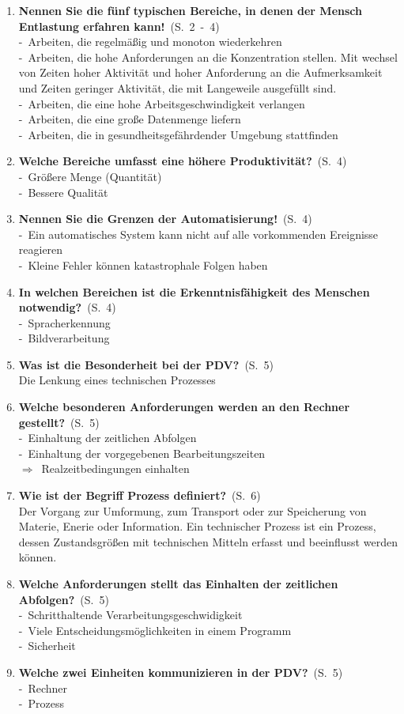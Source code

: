 \documentclass[a4paper,12pt]{article}
\newcommand{\question}[3]{\pagebreak[3]\item {\textbf{#1?}}\ (S.\ #2)#3}
\newcommand{\statement}[3]{\pagebreak[3]\item {\textbf{#1!}}\ (S.\ #2)#3}
\newcommand{\catchword}[1]{\\-\ #1}
\newcommand{\normaltext}[1]{\\#1}
\newcommand{\result}[1]{\\ $\Rightarrow$\ #1}
\newcommand{\page}[1]{#1}
\newcommand{\pages}[2]{#1\ -\ #2}
\begin{document}
\begin{enumerate}
  \statement{Nennen Sie die fünf typischen Bereiche,
             in denen der Mensch Entlastung erfahren kann}{\pages{2}{4}}
  {
    \catchword{Arbeiten, die regelmäßig und monoton wiederkehren}
    \catchword{Arbeiten, die hohe Anforderungen an die Konzentration stellen. Mit wechsel von Zeiten
               hoher Aktivität und hoher Anforderung an die Aufmerksamkeit und Zeiten geringer Aktivität,
               die mit Langeweile ausgefüllt sind.}
    \catchword{Arbeiten, die eine hohe Arbeitsgeschwindigkeit verlangen}
    \catchword{Arbeiten, die eine große Datenmenge liefern}
    \catchword{Arbeiten, die in gesundheitsgefährdender Umgebung stattfinden}
  }

  \question{Welche Bereiche umfasst eine höhere Produktivität}{\page{4}}
  {
    \catchword{Größere Menge (Quantität)}
    \catchword{Bessere Qualität}
  }

  \statement{Nennen Sie die Grenzen der Automatisierung}{\page{4}}
  {
    \catchword{Ein automatisches System kann nicht auf alle vorkommenden Ereignisse reagieren}
    \catchword{Kleine Fehler können katastrophale Folgen haben}
  }

  \question{In welchen Bereichen ist die Erkenntnisfähigkeit des Menschen notwendig}{\page{4}}
  {
    \catchword{Spracherkennung}
    \catchword{Bildverarbeitung}
  }

  \question{Was ist die Besonderheit bei der PDV}{\page{5}}
  {
    \normaltext{Die Lenkung eines technischen Prozesses}
  }

  \question{Welche besonderen Anforderungen werden an den Rechner gestellt}{\page{5}}
  {
    \catchword{Einhaltung der zeitlichen Abfolgen}
    \catchword{Einhaltung der vorgegebenen Bearbeitungszeiten}
    \result{Realzeitbedingungen einhalten}
  }

  \question{Wie ist der Begriff Prozess definiert}{\page{6}}
  {
    \normaltext{Der Vorgang zur Umformung, zum Transport oder zur Speicherung von Materie, 
    Enerie oder Information. Ein technischer Prozess ist ein Prozess, dessen Zustandsgrößen
    mit technischen Mitteln erfasst und beeinflusst werden können.}
  }


  \question{Welche Anforderungen stellt das Einhalten der zeitlichen Abfolgen}{\page{5}}
  {
    \catchword{Schritthaltende Verarbeitungsgeschwidigkeit}
    \catchword{Viele Entscheidungsmöglichkeiten in einem Programm}
    \catchword{Sicherheit}
  }

  \question{Welche zwei Einheiten kommunizieren in der PDV}{\page{5}}
  {
    \catchword{Rechner}
    \catchword{Prozess}
  }


\end{enumerate}
\end{document}
